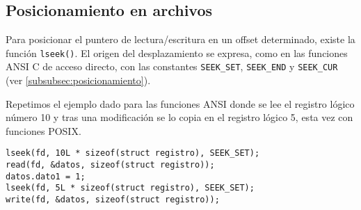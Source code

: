 \subsection{Posicionamiento en archivos}
Para posicionar el puntero de lectura/escritura en un offset determinado,
existe la función \lstinline{lseek()}. El origen del desplazamiento se expresa, como en las
funciones ANSI C de acceso directo, con las constantes \lstinline{SEEK_SET}, \lstinline{SEEK_END} y
\lstinline{SEEK_CUR} (ver \ref{subsubsec:posicionamiento}).

\begin{ejemplo}
Repetimos el ejemplo dado para las funciones ANSI donde se lee el registro
lógico número 10 y tras una modificación se lo copia en el registro lógico 5,
esta vez con funciones POSIX.
\begin{lstlisting}
lseek(fd, 10L * sizeof(struct registro), SEEK_SET);
read(fd, &datos, sizeof(struct registro));
datos.dato1 = 1;
lseek(fd, 5L * sizeof(struct registro), SEEK_SET);
write(fd, &datos, sizeof(struct registro));
\end{lstlisting}
\end{ejemplo}




